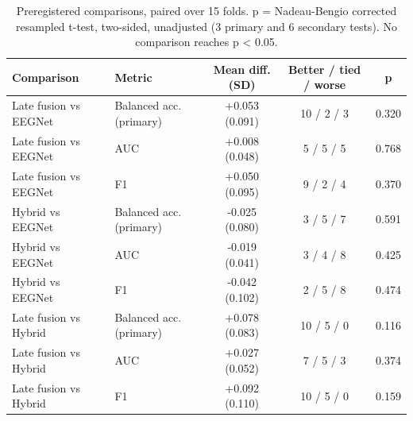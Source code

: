\begin{table}[!t]
\centering
\footnotesize
\caption{Preregistered comparisons, paired over 15 folds. p = Nadeau-Bengio corrected resampled t-test, two-sided, unadjusted (3 primary and 6 secondary tests). No comparison reaches p < 0.05.}
\label{tab:table2_comparisons}
\begin{tabular}{llccc}
\toprule
Comparison & Metric & Mean diff. (SD) & Better / tied / worse & p \\
\midrule
Late fusion vs EEGNet & Balanced acc. (primary) & +0.053 (0.091) & 10 / 2 / 3 & 0.320 \\
Late fusion vs EEGNet & AUC & +0.008 (0.048) & 5 / 5 / 5 & 0.768 \\
Late fusion vs EEGNet & F1 & +0.050 (0.095) & 9 / 2 / 4 & 0.370 \\
Hybrid vs EEGNet & Balanced acc. (primary) & -0.025 (0.080) & 3 / 5 / 7 & 0.591 \\
Hybrid vs EEGNet & AUC & -0.019 (0.041) & 3 / 4 / 8 & 0.425 \\
Hybrid vs EEGNet & F1 & -0.042 (0.102) & 2 / 5 / 8 & 0.474 \\
Late fusion vs Hybrid & Balanced acc. (primary) & +0.078 (0.083) & 10 / 5 / 0 & 0.116 \\
Late fusion vs Hybrid & AUC & +0.027 (0.052) & 7 / 5 / 3 & 0.374 \\
Late fusion vs Hybrid & F1 & +0.092 (0.110) & 10 / 5 / 0 & 0.159 \\
\bottomrule
\end{tabular}
\end{table}
